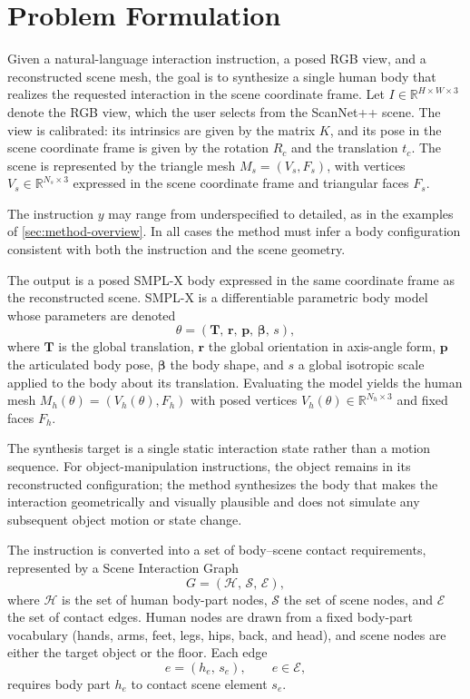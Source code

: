 \section{Problem Formulation}
\label{sec:problem-formulation}

Given a natural-language interaction instruction, a posed RGB view, and a reconstructed scene mesh, the goal is to synthesize a single human body that realizes the requested interaction in the scene coordinate frame. Let $I \in \mathbb{R}^{H \times W \times 3}$ denote the RGB view, which the user selects from the ScanNet++ scene. The view is calibrated: its intrinsics are given by the matrix $K$, and its pose in the scene coordinate frame is given by the rotation $R_c$ and the translation $t_c$. The scene is represented by the triangle mesh $M_s = (V_s, F_s)$, with vertices $V_s \in \mathbb{R}^{N_s \times 3}$ expressed in the scene coordinate frame and triangular faces $F_s$.

The instruction $y$ may range from underspecified to detailed, as in the examples of \cref{sec:method-overview}. In all cases the method must infer a body configuration consistent with both the instruction and the scene geometry.

The output is a posed SMPL-X body expressed in the same coordinate frame as the reconstructed scene. SMPL-X is a differentiable parametric body model whose parameters are denoted
\begin{equation}
\label{eq:smplx-params}
\theta = (\mathbf{T},\, \mathbf{r},\, \mathbf{p},\, \boldsymbol{\beta},\, s),
\end{equation}
where $\mathbf{T}$ is the global translation, $\mathbf{r}$ the global orientation in axis-angle form, $\mathbf{p}$ the articulated body pose, $\boldsymbol{\beta}$ the body shape, and $s$ a global isotropic scale applied to the body about its translation. Evaluating the model yields the human mesh $M_h(\theta) = (V_h(\theta), F_h)$ with posed vertices $V_h(\theta) \in \mathbb{R}^{N_h \times 3}$ and fixed faces $F_h$.

The synthesis target is a single static interaction state rather than a motion sequence. For object-manipulation instructions, the object remains in its reconstructed configuration; the method synthesizes the body that makes the interaction geometrically and visually plausible and does not simulate any subsequent object motion or state change.

The instruction is converted into a set of body--scene contact requirements, represented by a Scene Interaction Graph
\begin{equation}
\label{eq:sig}
G = (\mathcal{H},\, \mathcal{S},\, \mathcal{E}),
\end{equation}
where $\mathcal{H}$ is the set of human body-part nodes, $\mathcal{S}$ the set of scene nodes, and $\mathcal{E}$ the set of contact edges. Human nodes are drawn from a fixed body-part vocabulary (hands, arms, feet, legs, hips, back, and head), and scene nodes are either the target object or the floor. Each edge
\begin{equation}
\label{eq:sig-edge}
e = (h_e,\, s_e), \qquad e \in \mathcal{E},
\end{equation}
requires body part $h_e$ to contact scene element $s_e$.


